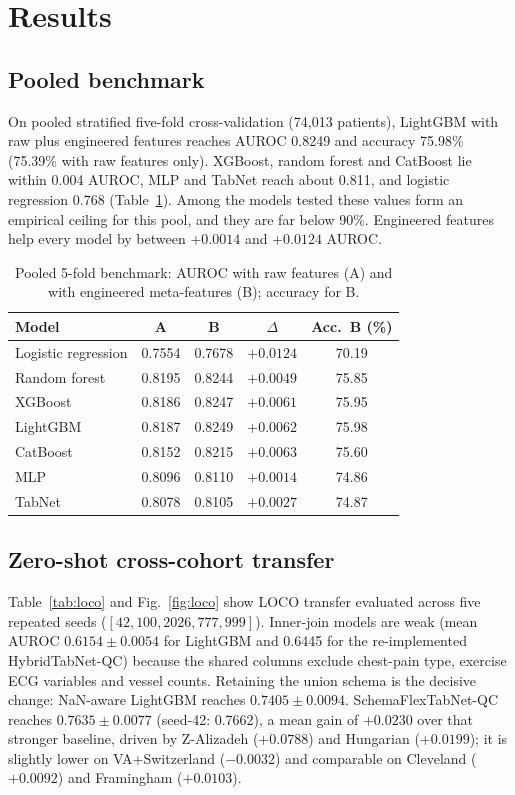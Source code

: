 \documentclass[journal]{IEEEtran}
\newcommand{\sfn}{SchemaFlexTabNet-QC}
\newcommand{\htn}{HybridTabNet-QC}
\begin{document}
\section{Results}\label{sec:results}
\subsection{Pooled benchmark}\label{sec:pooled}
On pooled stratified five-fold cross-validation (74{,}013 patients), LightGBM with raw plus engineered features reaches AUROC 0.8249 and accuracy 75.98\% (75.39\% with raw features only). XGBoost, random forest and CatBoost lie within 0.004 AUROC, MLP and TabNet reach about 0.811, and logistic regression 0.768 (Table~\ref{tab:pooled}). Among the models tested these values form an empirical ceiling for this pool, and they are far below 90\%. Engineered features help every model by between $+0.0014$ and $+0.0124$ AUROC.

\begin{table}[t]
\caption{Pooled 5-fold benchmark: AUROC with raw features (A) and with engineered meta-features (B); accuracy for B.}
\label{tab:pooled}
\centering\footnotesize
\begin{tabular}{lcccc}
\toprule
Model & A & B & $\Delta$ & Acc.\ B (\%)\\
\midrule
Logistic regression & 0.7554 & 0.7678 & $+0.0124$ & 70.19\\
Random forest & 0.8195 & 0.8244 & $+0.0049$ & 75.85\\
XGBoost & 0.8186 & 0.8247 & $+0.0061$ & 75.95\\
LightGBM & 0.8187 & 0.8249 & $+0.0062$ & 75.98\\
CatBoost & 0.8152 & 0.8215 & $+0.0063$ & 75.60\\
MLP & 0.8096 & 0.8110 & $+0.0014$ & 74.86\\
TabNet & 0.8078 & 0.8105 & $+0.0027$ & 74.87\\
\bottomrule
\end{tabular}
\end{table}

\subsection{Zero-shot cross-cohort transfer}
Table~\ref{tab:loco} and Fig.~\ref{fig:loco} show LOCO transfer evaluated across five repeated seeds ($[42, 100, 2026, 777, 999]$). Inner-join models are weak (mean AUROC $0.6154 \pm 0.0054$ for LightGBM and 0.6445 for the re-implemented \htn{}) because the shared columns exclude chest-pain type, exercise ECG variables and vessel counts. Retaining the union schema is the decisive change: NaN-aware LightGBM reaches $0.7405 \pm 0.0094$. \sfn{} reaches $0.7635 \pm 0.0077$ (seed-42: 0.7662), a mean gain of $+0.0230$ over that stronger baseline, driven by Z-Alizadeh ($+0.0788$) and Hungarian ($+0.0199$); it is slightly lower on VA+Switzerland ($-0.0032$) and comparable on Cleveland ($+0.0092$) and Framingham ($+0.0103$).
\end{document}
